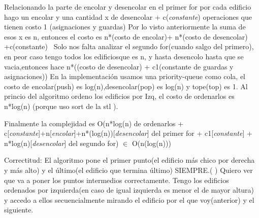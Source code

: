\documentclass{article}
\begin{document}
Relacionando la parte de encolar y desencolar en el primer for
por cada edificio hago un encolar y una cantidad x de desencolar + c(\textit{constante}) operaciones que tienen costo 1 (asignaciones y guardas)
Por lo visto anteriormente la suma de esos x es n, entonces el costo es  n*(costo de encolar)+ n*(costo de desencolar) +c(constante)
\newline\
Solo nos falta analizar el segundo for(cuando salgo del primero), en peor caso tengo todos los edificiosque es  n, y hasta desencolo hasta que se vacia,entonces hace n*((costo de desencolar) + c1(constante de guardas y asignaciones))
En la implementación usamos una priority-queue como cola, el costo de encolar(push) es log(n),desencolar(pop) es log(n) y tope(top) es 1.
\newline
Al princio del algoritmo ordeno los edificios por Izq, el costo de ordenarlos es n*log(n) (porque uso sort de la stl \color{red}{según este link} \color{black}).\newline

Finalmente la complejidad es \newline
O(n*log(n) de ordenarlos \newline
+ c[\textit{constante}]+n[\textit{encolar}]+n*(log(n))[\textit{desencolar}] del primer for \newline
+ c1[\textit{constante}] + n*log(n)[\textit{desencolar}] del segundo for)  $\in$ O(n(log(n))) \newline
\color{red}{**} \color{black}
\newpage



{\noindent \Huge Correctitud:}
\newline \newline
El algoritmo pone el primer punto(el edificio más chico por derecha y más alto) y el último(el edificio que termina último) SIEMPRE.(\color{red}{dónde lo hace!!!} \color{black})\newline
Quiero ver que va a poner los puntos intermedios correctamente. \newline
Tengo los edificios ordenados por izquierda(en caso de igual izquierda es menor el de mayor altura) y accedo a ellos secuencialmente mirando el edificio por el que voy(anterior) y el siguiente.
\end{document}
